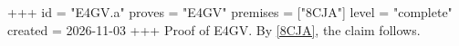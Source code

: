 +++
id = "E4GV.a"
proves = "E4GV"
premises = ["8CJA"]
level = "complete"
created = 2026-11-03
+++
Proof of E4GV. By \ref{8CJA}, the claim follows.
